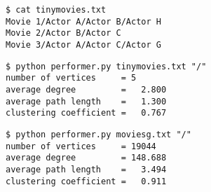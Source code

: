 \documentclass[8pt,a4paper,compress,handout]{beamer}
\begin{document}
\begin{frame}[fragile]
\begin{lstlisting}[language={}]
$ cat tinymovies.txt
Movie 1/Actor A/Actor B/Actor H
Movie 2/Actor B/Actor C
Movie 3/Actor A/Actor C/Actor G
\end{lstlisting}

\begin{lstlisting}[language={}]
$ python performer.py tinymovies.txt "/"
number of vertices     = 5
average degree         =   2.800
average path length    =   1.300
clustering coefficient =   0.767
\end{lstlisting}

\begin{lstlisting}[language={}]
$ python performer.py moviesg.txt "/"
number of vertices     = 19044
average degree         = 148.688
average path length    =   3.494
clustering coefficient =   0.911
\end{lstlisting}
\end{frame}
\end{document}
